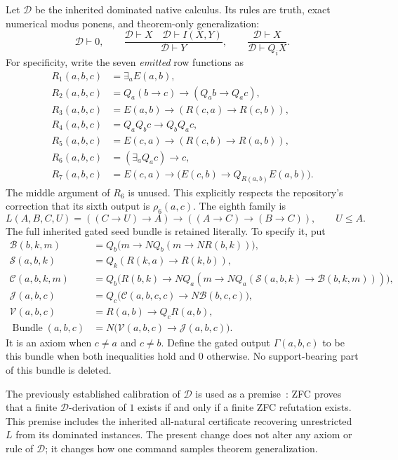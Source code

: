 Let $\mathcal D$ be the inherited dominated native calculus.  Its rules
are truth, exact numerical modus ponens, and theorem-only generalization:
\[
 \mathcal D\vdash0,\qquad
 \frac{\mathcal D\vdash X\quad\mathcal D\vdash I(X,Y)}
      {\mathcal D\vdash Y},\qquad
 \frac{\mathcal D\vdash X}{\mathcal D\vdash Q_iX}.
\]
For specificity, write the seven \emph{emitted} row functions as
\begin{align*}
 R_1(a,b,c)&=\exists_aE(a,b),\\
 R_2(a,b,c)&=Q_a(b\to c)\to(Q_ab\to Q_ac),\\
 R_3(a,b,c)&=E(a,b)\to(R(c,a)\to R(c,b)),\\
 R_4(a,b,c)&=Q_aQ_bc\to Q_bQ_ac,\\
 R_5(a,b,c)&=E(c,a)\to(R(c,b)\to R(a,b)),\\
 R_6(a,b,c)&=(\exists_aQ_ac)\to c,\\
 R_7(a,b,c)&=E(c,a)\to\bigl(E(c,b)\to Q_{R(a,b)}E(a,b)\bigr).
\end{align*}
The middle argument of $R_6$ is unused.  This explicitly respects the
repository's correction that its sixth output is $\rho_6(a,c)$.
The eighth family is
\[
 L(A,B,C,U)=((C\to U)\to A)\to((A\to C)\to(B\to C)),
 \qquad U\le A.
\]
The full inherited gated seed bundle is retained literally.  To specify it,
put
\begin{align*}
 \mathcal B(b,k,m)&=Q_b\bigl(m\to NQ_b(m\to NR(b,k))\bigr),\\
 \mathcal S(a,b,k)&=Q_k(R(k,a)\to R(k,b)),\\
 \mathcal C(a,b,k,m)&=Q_b\bigl(R(b,k)\to
      NQ_a(m\to NQ_a(\mathcal S(a,b,k)\to\mathcal B(b,k,m)))\bigr),\\
 \mathcal J(a,b,c)&=Q_c\bigl(\mathcal C(a,b,c,c)
                              \to N\mathcal B(b,c,c)\bigr),\\
 \mathcal V(a,b,c)&=R(a,b)\to Q_cR(a,b),\\
 \operatorname{Bundle}(a,b,c)&=N\bigl(\mathcal V(a,b,c)
                                          \to\mathcal J(a,b,c)\bigr).
\end{align*}
It is an axiom when $c\ne a$ and $c\ne b$.  Define the gated output
$\Gamma(a,b,c)$ to be this bundle when both inequalities hold and $0$
otherwise.  No support-bearing part of this bundle is deleted.

The previously established calibration of $\mathcal D$ is used as a
premise~\cite{dominated,st215}: ZFC proves that a finite $\mathcal D$-derivation of $1$ exists
if and only if a finite ZFC refutation exists.  This premise includes the
inherited all-natural certificate recovering unrestricted $L$ from its
dominated instances.  The present change does not alter any axiom or rule
of $\mathcal D$; it changes how one command samples theorem generalization.

